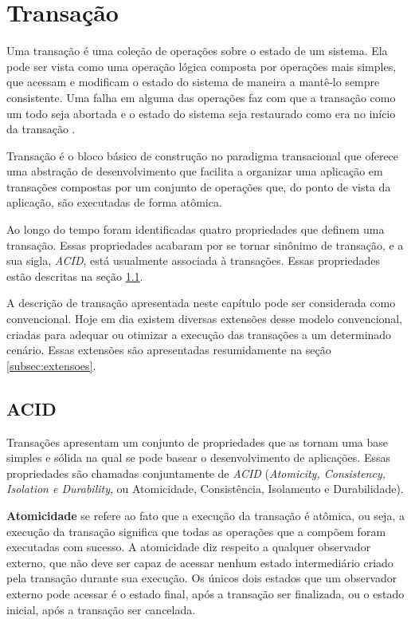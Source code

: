 \documentclass[11pt,twoside,a4paper]{book}
\begin{document}
\section{Transação}
\label{sec:transacao}
Uma transação é uma coleção de operações sobre o estado de um sistema. Ela pode ser vista como uma operação lógica composta por operações mais simples, que acessam e modificam o estado do sistema de maneira a mantê-lo sempre consistente. Uma falha em alguma das operações faz com que a transação como um todo seja abortada e o estado do sistema seja restaurado como era no início da transação \cite{garcia-molina, vaca, gray}.

Transação é o bloco básico de construção no paradigma transacional que oferece uma abstração de desenvolvimento que facilita a organizar uma aplicação em transações compostas por um conjunto de operações que, do ponto de vista da aplicação, são executadas de forma atômica. 

Ao longo do tempo foram identificadas quatro propriedades que definem uma transação. Essas propriedades acabaram por se tornar sinônimo de transação, e a sua sigla, \emph{ACID}, está usualmente associada à transações. Essas propriedades estão descritas na seção \ref{subsec:acid}.

A descrição de transação apresentada neste capítulo pode ser considerada como convencional. Hoje em dia existem diversas extensões desse modelo convencional, criadas para adequar ou otimizar a execução das transações a um determinado cenário. Essas extensões são apresentadas resumidamente na seção \ref{subsec:extensoes}.


\subsection{ACID}
\label{subsec:acid}
Transações apresentam um conjunto de propriedades que as tornam uma base simples e sólida na qual se pode basear o desenvolvimento de aplicações. Essas propriedades são chamadas conjuntamente de \emph{ACID} (\emph{Atomicity, Consistency, Isolation e Durability}, ou Atomicidade, Consistência, Isolamento e Durabilidade). 

\textbf{Atomicidade} se refere ao fato que a execução da transação é atômica, ou seja, a execução da transação significa que todas as operações que a compõem foram executadas com sucesso. A atomicidade diz respeito a qualquer observador externo, que não deve ser capaz de acessar nenhum estado intermediário criado pela transação durante sua execução. Os únicos dois estados que um observador externo pode acessar é o estado final, após a transação ser finalizada, ou o estado inicial, após a transação ser cancelada.
\end{document}
